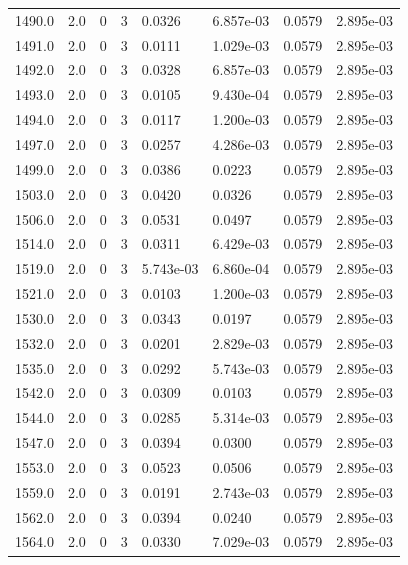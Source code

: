 \documentclass[preview]{standalone}
\begin{document}
{{{{{{{{{{\begin{tabular}{L{1.2cm}C{1.2cm} C{0.3cm}C{0.5cm} C{1.4cm}C{1.4cm} C{1.4cm}C{1.4cm}}
  1490.0  &   2.0  & 0     &  3 &  0.0326  & 6.857e-03  & 0.0579 &  2.895e-03   \\ 
  1491.0  &   2.0  & 0     &  3 &  0.0111  & 1.029e-03  & 0.0579 &  2.895e-03   \\ 
  1492.0  &   2.0  & 0     &  3 &  0.0328  & 6.857e-03  & 0.0579 &  2.895e-03   \\ 
  1493.0  &   2.0  & 0     &  3 &  0.0105  & 9.430e-04  & 0.0579 &  2.895e-03   \\ 
  1494.0  &   2.0  & 0     &  3 &  0.0117  & 1.200e-03  & 0.0579 &  2.895e-03   \\ 
  1497.0  &   2.0  & 0     &  3 &  0.0257  & 4.286e-03  & 0.0579 &  2.895e-03   \\ 
  1499.0  &   2.0  & 0     &  3 &  0.0386  & 0.0223  & 0.0579 &  2.895e-03   \\ 
  1503.0  &   2.0  & 0     &  3 &  0.0420  & 0.0326  & 0.0579 &  2.895e-03   \\ 
  1506.0  &   2.0  & 0     &  3 &  0.0531  & 0.0497  & 0.0579 &  2.895e-03   \\ 
  1514.0  &   2.0  & 0     &  3 &  0.0311  & 6.429e-03  & 0.0579 &  2.895e-03   \\ 
  1519.0  &   2.0  & 0     &  3 &  5.743e-03  & 6.860e-04  & 0.0579 &  2.895e-03   \\ 
  1521.0  &   2.0  & 0     &  3 &  0.0103  & 1.200e-03  & 0.0579 &  2.895e-03   \\ 
  1530.0  &   2.0  & 0     &  3 &  0.0343  & 0.0197  & 0.0579 &  2.895e-03   \\ 
  1532.0  &   2.0  & 0     &  3 &  0.0201  & 2.829e-03  & 0.0579 &  2.895e-03   \\ 
  1535.0  &   2.0  & 0     &  3 &  0.0292  & 5.743e-03  & 0.0579 &  2.895e-03   \\ 
  1542.0  &   2.0  & 0     &  3 &  0.0309  & 0.0103  & 0.0579 &  2.895e-03   \\ 
  1544.0  &   2.0  & 0     &  3 &  0.0285  & 5.314e-03  & 0.0579 &  2.895e-03   \\ 
  1547.0  &   2.0  & 0     &  3 &  0.0394  & 0.0300  & 0.0579 &  2.895e-03   \\ 
  1553.0  &   2.0  & 0     &  3 &  0.0523  & 0.0506  & 0.0579 &  2.895e-03   \\ 
  1559.0  &   2.0  & 0     &  3 &  0.0191  & 2.743e-03  & 0.0579 &  2.895e-03   \\ 
  1562.0  &   2.0  & 0     &  3 &  0.0394  & 0.0240  & 0.0579 &  2.895e-03   \\ 
  1564.0  &   2.0  & 0     &  3 &  0.0330  & 7.029e-03  & 0.0579 &  2.895e-03   \\ 

\end{tabular}}}}}}}}}}}
\end{document}
